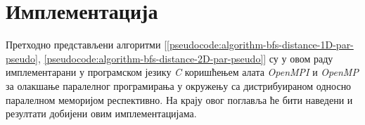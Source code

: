 \chapter{Имплементација}
Претходно представљени алгоритми [\ref{pseudocode:algorithm-bfs-distance-1D-par-pseudo}, \ref{pseudocode:algorithm-bfs-distance-2D-par-pseudo}] су у овом раду имплементарани у програмском језику \textit{C} коришћењем алата \textit{OpenMPI} и \textit{OpenMP} за олакшање паралелног програмирања у окружењу са дистрибуираном односно паралелном меморијом респективно. На крају овог поглавља ће бити наведени и резултати добијени овим имплементацијама.







%



